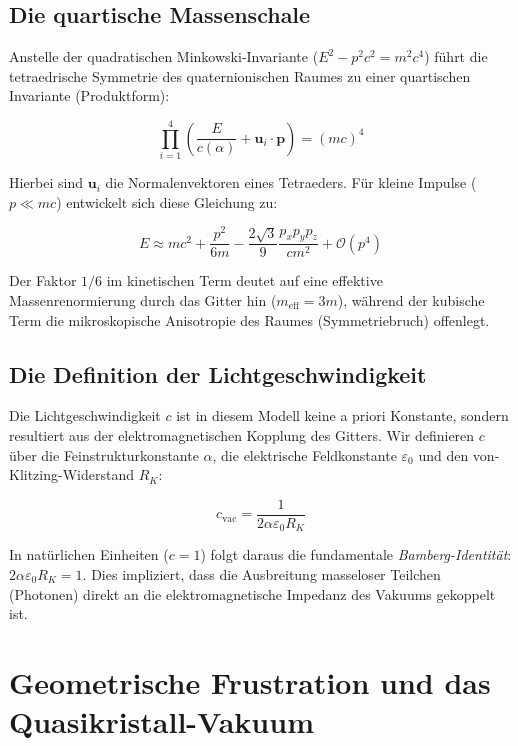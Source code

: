 \documentclass[11pt, a4paper]{article}
\begin{document}
	\subsection{Die quartische Massenschale}
	Anstelle der quadratischen Minkowski-Invariante ($E^2 - p^2c^2 = m^2c^4$) führt die tetraedrische Symmetrie des quaternionischen Raumes zu einer quartischen Invariante (Produktform):
	
	\begin{equation}
		\prod_{i=1}^4 \left( \frac{E}{c(\alpha)} + \mathbf{u}_i \cdot \mathbf{p} \right) = (mc)^4
	\end{equation}
	
	Hierbei sind $\mathbf{u}_i$ die Normalenvektoren eines Tetraeders. Für kleine Impulse ($p \ll mc$) entwickelt sich diese Gleichung zu:
	
	\begin{equation}
		E \approx mc^2 + \frac{p^2}{6m} - \frac{2\sqrt{3}}{9}\frac{p_x p_y p_z}{c m^2} + \mathcal{O}(p^4)
	\end{equation}
	
	Der Faktor $1/6$ im kinetischen Term deutet auf eine effektive Massenrenormierung durch das Gitter hin ($m_{\text{eff}} = 3m$), während der kubische Term die mikroskopische Anisotropie des Raumes (Symmetriebruch) offenlegt.
	
	\subsection{Die Definition der Lichtgeschwindigkeit}
	Die Lichtgeschwindigkeit $c$ ist in diesem Modell keine a priori Konstante, sondern resultiert aus der elektromagnetischen Kopplung des Gitters. Wir definieren $c$ über die Feinstrukturkonstante $\alpha$, die elektrische Feldkonstante $\varepsilon_0$ und den von-Klitzing-Widerstand $R_K$:
	
	\begin{equation}
		c_{\text{vac}} = \frac{1}{2\alpha \varepsilon_0 R_K}
	\end{equation}
	
	In natürlichen Einheiten ($c=1$) folgt daraus die fundamentale \textit{Bamberg-Identität}: $2\alpha \varepsilon_0 R_K = 1$. Dies impliziert, dass die Ausbreitung masseloser Teilchen (Photonen) direkt an die elektromagnetische Impedanz des Vakuums gekoppelt ist.
	
	\section{Geometrische Frustration und das Quasikristall-Vakuum}
	
\end{document}
